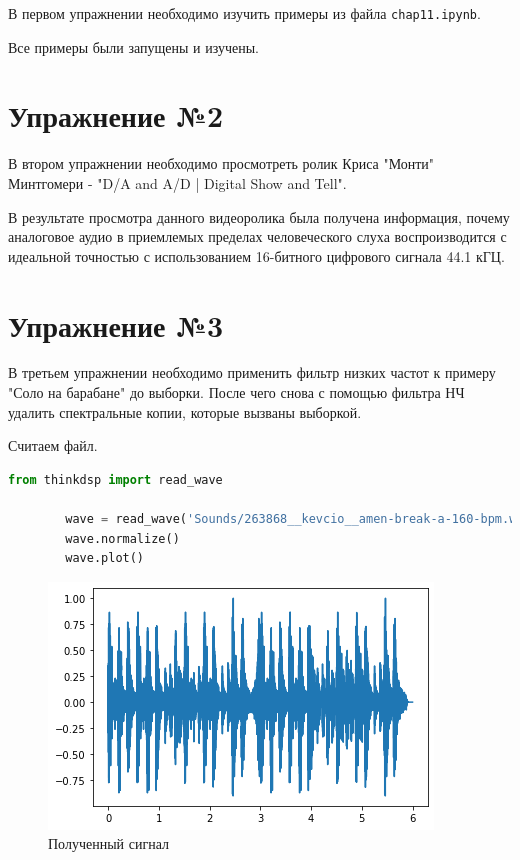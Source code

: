 \documentclass[a4paper, 14pt]{extarticle}
\begin{document}
    В первом упражнении необходимо изучить примеры из файла \texttt{chap11.ipynb}.

    Все примеры были запущены и изучены.

    \newpage


    \section{Упражнение №2}
    \label{sec:2}

    В втором упражнении необходимо просмотреть ролик Криса "Монти" Минтгомери - "D/A and A/D | Digital Show and Tell".

    В результате просмотра данного видеоролика была получена информация, почему аналоговое аудио в приемлемых пределах человеческого слуха воспроизводится с идеальной точностью с использованием 16-битного цифрового сигнала 44.1 кГЦ.

    \newpage


    \section{Упражнение №3}
    \label{sec:3}

    В третьем упражнении необходимо применить фильтр низких частот к примеру "Соло на барабане" до выборки.
    После чего снова с помощью фильтра НЧ удалить спектральные копии, которые вызваны выборкой.

    Считаем файл.

    \begin{lstlisting}[language=Python, caption= Считывание сигнала, label={lst:read_wave}]
        from thinkdsp import read_wave

        wave = read_wave('Sounds/263868__kevcio__amen-break-a-160-bpm.wav')
        wave.normalize()
        wave.plot()
    \end{lstlisting}

    \begin{figure}[H]
        \centering
        \includegraphics[width=0.8\linewidth]{drum_wave}
        \caption{Полученный сигнал}
        \label{fig:drum_wave}
    \end{figure}
\end{document}
